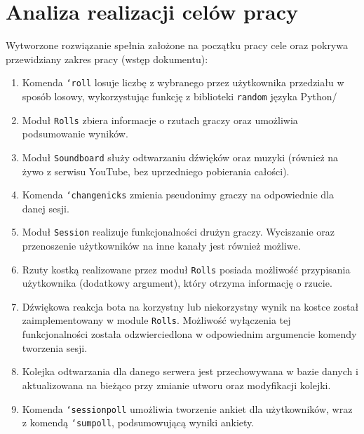 \documentclass[shortabstract,inz]{iithesis}
\begin{document}
		\section{Analiza realizacji celów pracy}
		Wytworzone rozwiązanie spełnia założone na początku pracy cele oraz pokrywa przewidziany zakres pracy (wstęp dokumentu):
		\begin{enumerate}
			\item Komenda \texttt{`roll} losuje liczbę z wybranego przez użytkownika przedziału w sposób losowy, wykorzystując funkcję z biblioteki \texttt{random} języka Python/
			\item Moduł \texttt{Rolls} zbiera informacje o rzutach graczy oraz umożliwia podsumowanie wyników.
			\item Moduł \texttt{Soundboard} służy odtwarzaniu dźwięków oraz muzyki (również na żywo z serwisu YouTube, bez uprzedniego pobierania całości).
			\item Komenda \texttt{`changenicks} zmienia pseudonimy graczy na odpowiednie dla danej sesji.
			\item Moduł \texttt{Session} realizuje funkcjonalności drużyn graczy. Wyciszanie oraz przenoszenie użytkowników na inne kanały jest również możliwe.
			\item Rzuty kostką realizowane przez moduł \texttt{Rolls} posiada możliwość przypisania użytkownika (dodatkowy argument), który otrzyma informację o rzucie.
			\item Dźwiękowa reakcja bota na korzystny lub niekorzystny wynik na kostce został zaimplementowany w module \texttt{Rolls}. Możliwość wyłączenia tej funkcjonalności została odzwierciedlona w odpowiednim argumencie komendy tworzenia sesji.
			\item Kolejka odtwarzania dla danego serwera jest przechowywana w bazie danych i aktualizowana na bieżąco przy zmianie utworu oraz modyfikacji kolejki.
			\item Komenda \texttt{`sessionpoll} umożliwia tworzenie ankiet dla użytkowników, wraz z komendą \texttt{`sumpoll}, podsumowującą wyniki ankiety.
		\end{enumerate}
	
\end{document}

